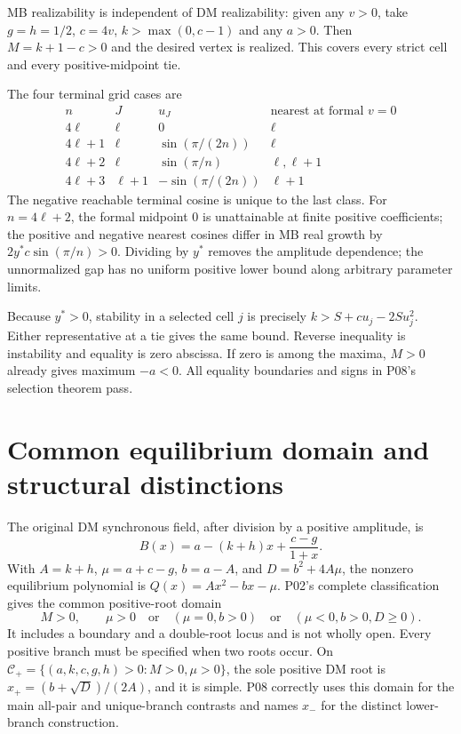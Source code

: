 \documentclass[11pt]{article}
\begin{document}
MB realizability is independent of DM realizability: given any $v>0$,
take $g=h=1/2$, $c=4v$, $k>\max(0,c-1)$ and any $a>0$.
Then $M=k+1-c>0$ and the desired vertex is realized. This covers every
strict cell and every positive-midpoint tie.

The four terminal grid cases are
\[
\begin{array}{c|c|c|c}
n&J&u_J&\text{nearest at formal }v=0\\\hline
4\ell&\ell&0&\ell\\
4\ell+1&\ell&\sin(\pi/(2n))&\ell\\
4\ell+2&\ell&\sin(\pi/n)&\ell,\ell+1\\
4\ell+3&\ell+1&-\sin(\pi/(2n))&\ell+1
\end{array}
\]
The negative reachable terminal cosine is unique to the last class.
For $n=4\ell+2$, the formal midpoint $0$ is unattainable at finite
positive coefficients; the positive and negative nearest cosines differ
in MB real growth by $2y^*c\sin(\pi/n)>0$. Dividing by $y^*$ removes
the amplitude dependence; the unnormalized gap has no uniform
positive lower bound along arbitrary parameter limits.

Because $y^*>0$, stability in a selected cell $j$ is precisely
$k>S+cu_j-2Su_j^2$. Either representative at a tie gives the same
bound. Reverse inequality is instability and equality is zero abscissa.
If zero is among the maxima, $M>0$ already gives maximum $-a<0$.
All equality boundaries and signs in P08's selection theorem pass.

\section{Common equilibrium domain and structural distinctions}
The original DM synchronous field, after division by a positive amplitude,
is
\[
 B(x)=a-(k+h)x+\frac{c-g}{1+x}.
\]
With $A=k+h$, $\mu=a+c-g$, $b=a-A$, and $D=b^2+4A\mu$,
the nonzero equilibrium polynomial is $Q(x)=Ax^2-bx-\mu$.
P02's complete classification gives the common positive-root domain
\[
 M>0,\qquad
 \mu>0\quad\text{or}\quad(\mu=0,b>0)
 \quad\text{or}\quad(\mu<0,b>0,D\ge0).
\]
It includes a boundary and a double-root locus and is not wholly open.
Every positive branch must be specified when two roots occur. On
$\mathcal C_+=\{(a,k,c,g,h)>0:M>0,\mu>0\}$, the sole positive
DM root is $x_+=(b+\sqrt D)/(2A)$, and it is simple. P08 correctly
uses this domain for the main all-pair and unique-branch contrasts and
names $x_-$ for the distinct lower-branch construction.
\end{document}
